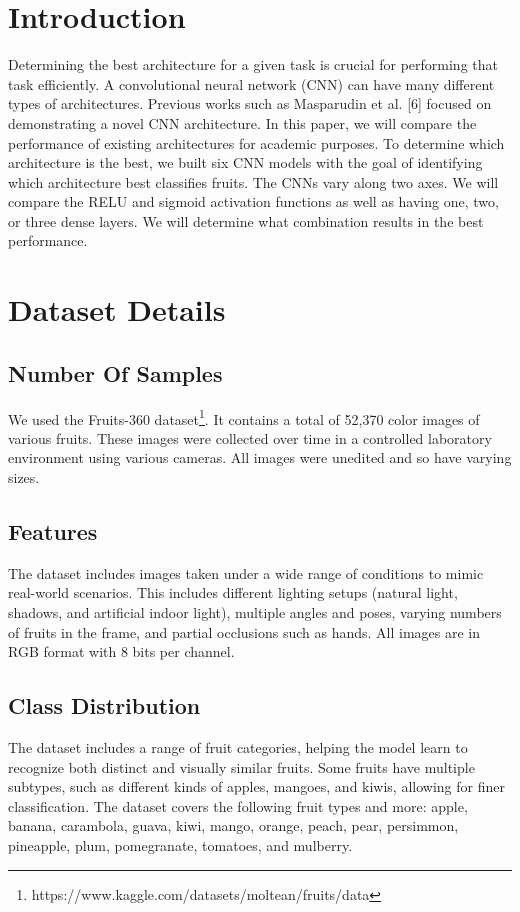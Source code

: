 \documentclass[conference]{IEEEtran}
\begin{document}
\section{Introduction}
Determining the best architecture for a given task is crucial for performing that task efficiently. A convolutional neural network (CNN) can have many different types of architectures. Previous works such as Masparudin et al. [6] focused on demonstrating a novel CNN architecture. In this paper, we will compare the performance of existing architectures for academic purposes. To determine which architecture is the best, we built six CNN models with the goal of identifying which architecture best classifies fruits. The CNNs vary along two axes. We will compare the RELU and sigmoid activation functions as well as having one, two, or three dense layers. We will determine what combination results in the best performance.

\section{Dataset Details}

\subsection{Number Of Samples}

We used the Fruits-360 dataset\footnote{https://www.kaggle.com/datasets/moltean/fruits/data}. It contains a total of 52,370 color images of various fruits. These images were collected over time in a controlled laboratory environment using various cameras. All images were unedited and so have varying sizes.

\subsection{Features}
The dataset includes images taken under a wide range of conditions to mimic real-world scenarios. This includes different lighting setups (natural light, shadows, and artificial indoor light), multiple angles and poses, varying numbers of fruits in the frame, and partial occlusions such as hands. All images are in RGB format with 8 bits per channel.

\subsection{Class Distribution}\label{AA}
The dataset includes a range of fruit categories, helping the model learn to recognize both distinct and visually similar fruits. Some fruits have multiple subtypes, such as different kinds of apples, mangoes, and kiwis, allowing for finer classification. The dataset covers the following fruit types and more: apple, banana, carambola, guava, kiwi, mango, orange, peach, pear, persimmon, pineapple, plum, pomegranate, tomatoes, and mulberry.
\end{document}
